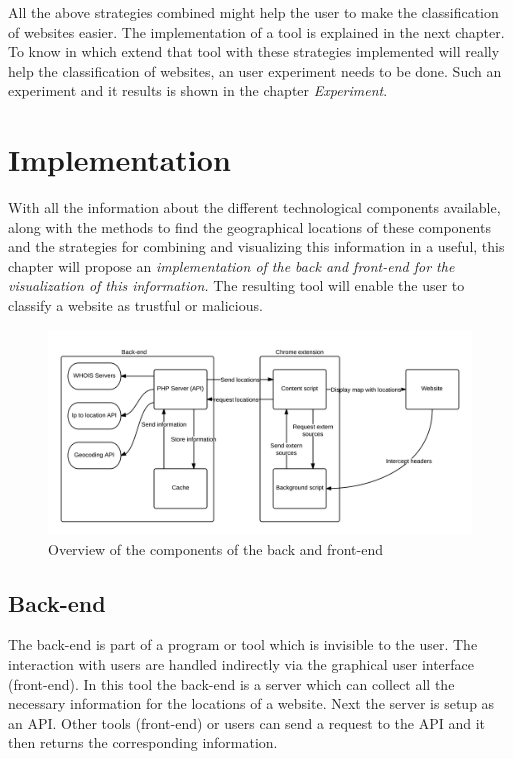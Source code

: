 \documentclass[twoside,openright,notitlepage]{uva-bachelor-thesis}
\begin{document}
All the above strategies combined might help the user to make the classification of websites easier. The implementation of a tool is explained in the next chapter. To know in which extend that tool with these strategies implemented will really help the classification of websites, an user experiment needs to be done. Such an experiment and it results is shown in the chapter \emph{Experiment}.

\chapter{Implementation}
With all the information about the different technological components available, along with the methods to find the geographical locations of these components and the strategies for combining and visualizing this information in a useful, this chapter will propose an \emph{implementation of the back and front-end for the visualization of this information.} The resulting tool will enable the user to classify a website as trustful or malicious.

\begin{figure}[h!]
    \centering
    \includegraphics[width=1.2\textwidth, center]{img/implementation.png}
    \caption{Overview of the components of the back and front-end}
    \label{fig:implementation}
\end{figure}

\FloatBarrier

\section{Back-end}
The back-end is part of a program or tool which is invisible to the user. The interaction with users are handled indirectly via the graphical user interface (front-end). In this tool the back-end is a server which can collect all the necessary information for the locations of a website. Next the server is setup as an API. Other tools (front-end) or users can send a request to the API and it then returns the corresponding information.
\end{document}
